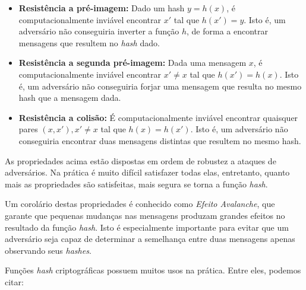 \begin{itemize}
  \item \textbf{Resistência a pré-imagem:} Dado um hash $y = h(x)$, é computacionalmente inviável encontrar $x'$ tal que $h(x') = y$. Isto é, um adversário não conseguiria inverter a função $h$, de forma a encontrar mensagens que resultem no \emph{hash} dado.

  \item \textbf{Resistência a segunda pré-imagem:} Dada uma mensagem $x$, é computacionalmente inviável encontrar $x' \neq x$ tal que $h(x') = h(x)$. Isto é, um adversário não conseguiria forjar uma mensagem que resulta no mesmo hash que a mensagem dada.

  \item \textbf{Resistência a colisão:} É computacionalmente inviável encontrar quaisquer pares $(x, x'), x' \neq x$ tal que $h(x) = h(x')$. Isto é, um adversário não conseguiria encontrar duas mensagens distintas que resultem no mesmo hash.
 \end{itemize}

As propriedades acima estão dispostas em ordem de robustez a ataques de adversários. Na prática é muito difícil satisfazer todas elas, entretanto, quanto mais as propriedades são satisfeitas, mais segura se torna a função \emph{hash}.

Um corolário destas propriedades é conhecido como \emph{Efeito Avalanche}, que garante que pequenas mudanças nas mensagens produzam grandes efeitos no resultado da função \emph{hash}. Isto é especialmente importante para evitar que um adversário seja capaz de determinar a semelhança entre duas mensagens apenas observando seus \emph{hashes}.

Funções \emph{hash} criptográficas possuem muitos usos na prática. Entre eles, podemos citar:


